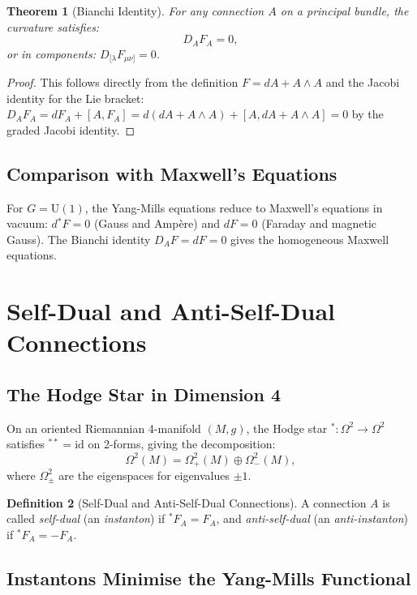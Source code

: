 \documentclass[12pt,a4paper]{amsart}
\newtheorem{theorem}{Theorem}[section]
\theoremstyle{definition}
\newtheorem{definition}[theorem]{Definition}
\theoremstyle{remark}
\begin{document}
\begin{theorem}[Bianchi Identity]
For any connection $A$ on a principal bundle, the curvature satisfies:
\[
  D_A F_A = 0,
\]
or in components: $D_{[\lambda} F_{\mu\nu]} = 0$.
\end{theorem}

\begin{proof}
This follows directly from the definition $F = dA + A \wedge A$ and the Jacobi
identity for the Lie bracket: $D_A F_A = d F_A + [A, F_A] = d(dA + A\wedge A) +
[A, dA + A\wedge A] = 0$ by the graded Jacobi identity.
\end{proof}

\subsection{Comparison with Maxwell's Equations}

For $G = \mathrm{U}(1)$, the Yang-Mills equations reduce to Maxwell's equations in
vacuum: $d{}^* F = 0$ (Gauss and Amp\`ere) and $dF = 0$ (Faraday and magnetic
Gauss). The Bianchi identity $D_A F = dF = 0$ gives the homogeneous Maxwell equations.

\section{Self-Dual and Anti-Self-Dual Connections}
\label{sec:self-dual}

\subsection{The Hodge Star in Dimension 4}

On an oriented Riemannian 4-manifold $(M, g)$, the Hodge star ${}^*: \Omega^2 \to \Omega^2$
satisfies ${}^{**} = \mathrm{id}$ on 2-forms, giving the decomposition:
\[
  \Omega^2(M) = \Omega^2_+(M) \oplus \Omega^2_-(M),
\]
where $\Omega^2_\pm$ are the eigenspaces for eigenvalues $\pm 1$.

\begin{definition}[Self-Dual and Anti-Self-Dual Connections]
A connection $A$ is called \emph{self-dual} (an \emph{instanton}) if ${}^*F_A = F_A$,
and \emph{anti-self-dual} (an \emph{anti-instanton}) if ${}^*F_A = -F_A$.
\end{definition}

\subsection{Instantons Minimise the Yang-Mills Functional}
\end{document}
